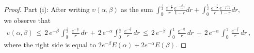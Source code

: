 \documentclass[10pt]{article}
\numberwithin{equation}{section}
\theoremstyle{definition}
\begin{document}
\begin{proof} Part (i): After writing  $\upsilon(\alpha,\beta)$ as the sum $\int_0^{\frac{1}{2}}  \frac{  e^{-\frac{\alpha}{ 
r}   } }{r }\frac{  e^{-\frac{ \beta}{ 1-r}   } }{ 1-r  }dr +\int_0^{\frac{1}{2}}  \frac{  e^{-\frac{\beta}{ 
r}   } }{r }\frac{  e^{-\frac{ \alpha}{ 1-r}   } }{ 1-r  }dr$, we observe that
\begin{align*}
 \upsilon(\alpha,\beta) \,\leq \, 2 \,e^{-\beta  } \,\int_0^{\frac{1}{2}}  \,\frac{  e^{-\frac{\alpha}{ 
r}   } }{r }\, dr \,+\,2\, e^{-\alpha   } \int_0^{\frac{1}{2}} \, \frac{  e^{-\frac{\beta}{ 
r}   } }{r }\, dr  
\,\leq \, 2 \,e^{-\beta  } \,\int_0^{1}\,  \frac{  e^{-\frac{\alpha}{ 
r}   } }{r }\, dr \,+\,2 \,e^{-\alpha  }\, \int_0^{1} \, \frac{  e^{-\frac{\beta}{ 
r}   } }{r } \, dr  \,,
\end{align*}
where the right side is equal to $2 e^{-\beta   } E(\alpha)+2 e^{-\alpha  } E(\beta) $.  \vspace{.2cm}


\end{proof}
\end{document}
